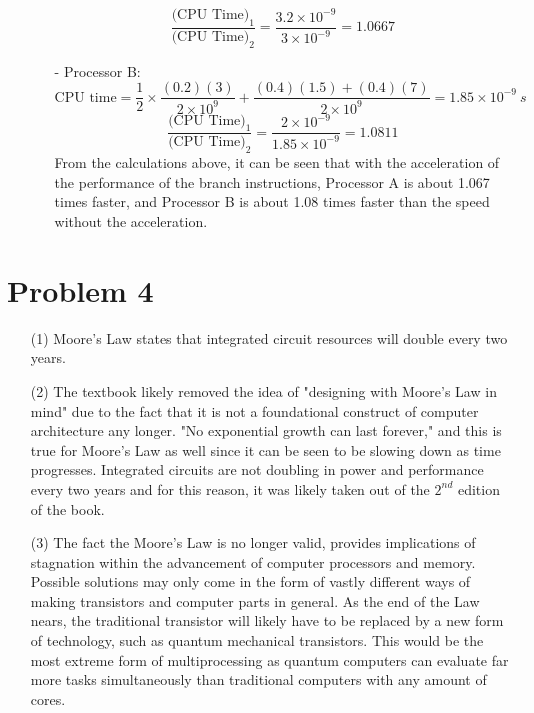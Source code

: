 \documentclass[12pt]{article}
\begin{document}
\begin{enumerate}
\begin{itemize}
\[                    \]
                    \[
                        \frac{\text{(CPU Time)}_{1}}{\text{(CPU Time)}_{2}} =
                        \frac{3.2 \times 10^{-9}}{3 \times 10^{-9}}= 1.0667
                    \]
                \item[-] Processor B:
                    \[
                        \text{CPU time} = \frac{1}{2} \times \frac{(0.2)(3)}{2
                        \times 10^{9}} + \frac{(0.4)(1.5) + (0.4)(7)}{2 \times
                        10^{9}} = 1.85 \times 10^{-9}\ s
                    \]
                    \[
                        \frac{\text{(CPU Time)}_{1}}{\text{(CPU Time)}_{2}} =
                        \frac{2 \times 10^{-9}}{1.85 \times 10^{-9}}= 1.0811
                    \]
                From the calculations above, it can be seen that with the
                acceleration of the performance of the branch instructions,
                Processor A is about 1.067 times faster, and Processor B is
                about 1.08 times faster than the speed without the
                acceleration.
            \end{itemize}
    \end{enumerate}
    \section*{Problem 4}
    \begin{enumerate}
        \item[(1)]
            Moore's Law states that integrated circuit resources will double
            every two years.
        \item[(2)]
            The textbook likely removed the idea of "designing with Moore's Law
            in mind" due to the fact that it is not a foundational construct of
            computer architecture any longer. "No exponential growth can last
            forever," and this is true for Moore's Law as well since it can be
            seen to be slowing down as time progresses. Integrated circuits are
            not doubling in power and performance every two years and for this
            reason, it was likely taken out of the $2^{nd}$ edition of the book.
        \item[(3)]
            The fact the Moore's Law is no longer valid, provides implications
            of stagnation within the advancement of computer processors and
            memory. Possible solutions may only come in the form of vastly
            different ways of making transistors and computer parts in general.
            As the end of the Law nears, the traditional transistor will likely
            have to be replaced by a new form of technology, such as quantum
            mechanical transistors. This would be the most extreme form of
            multiprocessing as quantum computers can evaluate far more tasks
            simultaneously than traditional computers with any amount of cores.
    \end{enumerate}
\end{document}
